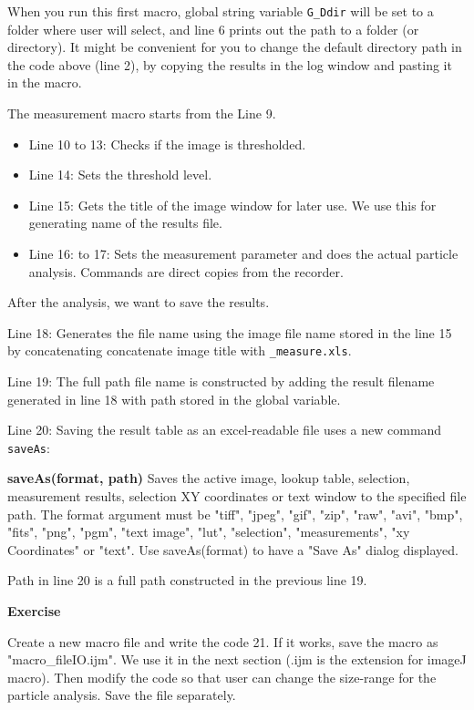 \documentclass[11pt,a4paper,oneside]{report}
\newenvironment{indentexercise}[1]%
{{\setlength{\leftmargin}{2em}}%
\textbf{Exercise \thesubsection-#1}%
\begin{list}{}%
	\item%
}
{\end{list}}
\newenvironment{indentCom}%
{\begin{list}{}%
         {\setlength{\leftmargin}{1em}}%
         \item[]%
}
{\end{list}}
\newcommand{\ilcom}[1]{\texttt{\small#1}}
\begin{document}
When you run this first macro, global string variable \ilcom{G\_Ddir} 
will be set to a folder where user will select, and line 6 prints out the path to 
a folder (or directory). It might be convenient for you to change the default directory path 
in the code above (line 2), by copying the results in the log window and pasting it in the macro. 

The measurement macro starts from the Line 9. 
\begin{itemize}
\item Line 10 to 13: Checks if the image is thresholded. 
\item Line 14: Sets the threshold level. 
\item Line 15: Gets the title of the image window for later use. We use this for 
generating name of the results file.
\item Line 16: to 17: Sets the measurement parameter and does the actual 
particle analysis. Commands are direct copies from the recorder. 
\end{itemize}
After the analysis, we want to save the results. 
\begin{itemize}
\item Line 18: Generates the file name using the image file name stored in the line 15 by concatenating concatenate image title with \ilcom{\_measure.xls}. 
\item Line 19: The full path file name is constructed by adding the result filename generated in line 18 with path stored in the global variable. 
\item Line 20: Saving the result table as an excel-readable file uses a new command \ilcom{saveAs}:
\begin{indentCom}
\textbf{saveAs(format, path)}
Saves the active image, lookup table, selection, measurement results, selection XY coordinates or text window to the specified file path. The format argument must be "tiff", "jpeg", "gif", "zip", "raw", "avi", "bmp", "fits", "png", "pgm", "text image", "lut", "selection", "measurements", "xy Coordinates" or "text". Use saveAs(format) to have a "Save As" dialog displayed.
\end{indentCom}
Path in line 20 is a full path constructed in the previous line 19.
\end{itemize}

\begin{indentexercise}{1}
Create a new macro file and write the code 21. If it works, save the macro as "macro\_fileIO.ijm". We use it in the next section (.ijm is the extension for imageJ macro). 
Then modify the code so that user can change the size-range for the particle analysis. Save the file separately.   
\end{indentexercise}
\end{document}
